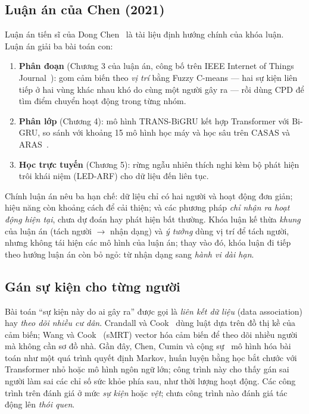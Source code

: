 \subsection{Luận án của Chen (2021)}

Luận án tiến sĩ của Dong Chen~\cite{chen2021thesis} là tài liệu định hướng chính của khóa luận. Luận
án giải ba bài toán con:
\begin{enumerate}
  \item \textbf{Phân đoạn} (Chương 3 của luận án, công bố trên IEEE Internet of Things
  Journal~\cite{chen2021fcmcpd}): gom cảm biến theo \emph{vị trí} bằng Fuzzy C-means --- hai sự kiện
  liên tiếp ở hai vùng khác nhau khó do cùng một người gây ra --- rồi dùng CPD để tìm điểm chuyển
  hoạt động trong từng nhóm.
  \item \textbf{Phân lớp} (Chương 4): mô hình TRANS-BiGRU kết hợp Transformer với Bi-GRU, so sánh với
  khoảng 15 mô hình học máy và học sâu trên CASAS và ARAS~\cite{alemdar2013aras}.
  \item \textbf{Học trực tuyến} (Chương 5): rừng ngẫu nhiên thích nghi kèm bộ phát hiện trôi khái
  niệm (LED-ARF) cho dữ liệu đến liên tục.
\end{enumerate}
Chính luận án nêu ba hạn chế: dữ liệu chỉ có hai người và hoạt động đơn giản; hiệu năng còn khoảng
cách để cải thiện; và các phương pháp \emph{chỉ nhận ra hoạt động hiện tại}, chưa dự đoán hay phát
hiện bất thường. Khóa luận kế thừa \emph{khung} của luận án (tách người $\rightarrow$ nhận dạng) và
\emph{ý tưởng} dùng vị trí để tách người, nhưng không tái hiện các mô hình của luận án; thay vào đó,
khóa luận đi tiếp theo hướng luận án còn bỏ ngỏ: từ nhận dạng sang \emph{hành vi dài hạn}.

\subsection{Gán sự kiện cho từng người}

Bài toán ``sự kiện này do ai gây ra'' được gọi là \emph{liên kết dữ liệu} (data association) hay
\emph{theo dõi nhiều cư dân}. Crandall và Cook~\cite{crandall2009coping} dùng luật dựa trên đồ thị
kề của cảm biến; Wang và Cook~\cite{wang2021smrt} (sMRT) vector hóa cảm biến để theo dõi nhiều người
mà không cần sơ đồ nhà. Gần đây, Chen, Cumin và cộng sự~\cite{chen2026mdp} mô hình hóa bài toán như
một quá trình quyết định Markov, huấn luyện bằng học bắt chước với Transformer nhỏ hoặc mô hình ngôn
ngữ lớn; công trình này cho thấy gán sai người làm sai các chỉ số sức khỏe phía sau, như thời lượng
hoạt động. Các công trình trên đánh giá ở mức \emph{sự kiện} hoặc \emph{vệt}; chưa công trình nào
đánh giá tác động lên \emph{thói quen}.

